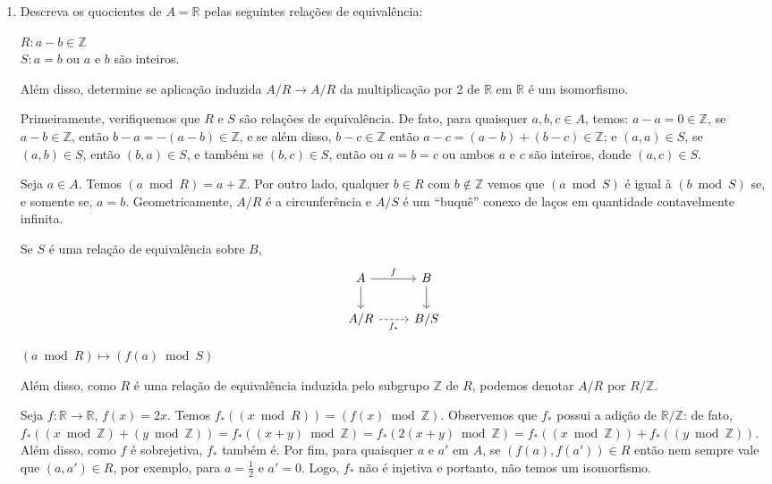 \begin{exemplo}
  \leavevmode
  \begin{enumerate}[left=0.5cm, align=left, nosep]
    \item Descreva os quocientes de $A = \mathbb{R}$ pelas seguintes relações de equivalência:

      $R: a - b \in \mathbb{Z}$ \\
      $S: a = b$ ou $a$ e $b$ são inteiros.

      Além disso, determine se aplicação induzida $A/R \to A/R$ da multiplicação por 2 de $\mathbb{R}$ em $\mathbb{R}$ é um 
      isomorfismo.

      Primeiramente, verifiquemos que $R$ e $S$ são relações de equivalência. De fato, para quaisquer $a,b,c \in A$, temos:
      $a - a = 0 \in \mathbb{Z}$, se $a - b \in \mathbb{Z}$, então $b - a = -(a - b) \in \mathbb{Z}$, e se além disso,
      $b - c \in \mathbb{Z}$ então $a - c = (a - b) + (b - c) \in \mathbb{Z}$; e $(a,a) \in S$, se $(a,b) \in S$, então 
      $(b,a) \in S$, e também se $(b,c) \in S$, então ou $a = b = c$ ou ambos $a$ e $c$ são inteiros, donde $(a,c) \in S$.

      Seja $a \in A$. Temos $(a \bmod R) = a + \mathbb{Z}$. Por outro lado, qualquer $b \in R$ com $b \notin \mathbb{Z}$ vemos que
      $(a \bmod S)$ é igual à $(b \bmod S)$ se, e somente se, $a = b$. Geometricamente, $A/R$ é a circunferência e $A/S$ é 
      um ``buquê'' conexo de laços em quantidade contavelmente infinita.  
    
      Se $S$ é uma relação de equivalência sobre $B$,
      \[
        \begin{tikzcd}
        A \arrow[r, "f"] \arrow[d] 
          & B \arrow[d] \\
          A/R \arrow[r, dashed, "f_*"'] 
          & B/S
        \end{tikzcd} 
      \]
      \begin{center}
        $(a \bmod R) \mapsto (f(a) \bmod S)$
      \end{center}

      Além disso, como $R$ é uma relação de equivalência induzida pelo subgrupo $\mathbb{Z}$ de $R$, podemos denotar 
      $A/R$ por $R/\mathbb{Z}$.

      Seja $f: \mathbb{R} \to \mathbb{R}$, $f(x) = 2x$. Temos  $f_*((x \bmod R)) = (f(x) \bmod \mathbb{Z})$. Observemos que $f_*$
      possui a adição de $\mathbb{R}/\mathbb{Z}$: de fato, $f_*( (x \bmod \mathbb{Z}) + (y \bmod \mathbb{Z}) ) = f_*( (x + y) \bmod 
      \mathbb{Z}) = f_*(2(x + y) \bmod \mathbb{Z}) = f_*( (x \bmod \mathbb{Z}) ) + f_*( (y \bmod \mathbb{Z}) )$. Além disso, como
      $f$ é sobrejetiva, $f_*$ também é. Por fim, para quaisquer $a$ e $a'$ em $A$, se $(f(a), f(a')) \in R$ então nem sempre vale 
      que $(a, a') \in R$, por exemplo, para $a = \frac{1}{2}$ e $a' = 0$. Logo, $f_*$ não é injetiva e portanto, não temos um 
      isomorfismo.


\end{enumerate}
\end{exemplo}
